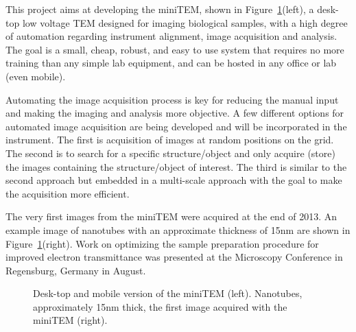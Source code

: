 \documentclass[10pt, a4paper]{article}
\begin{document}
\begin{enumerate}
{This project aims at developing the miniTEM, shown in Figure~\ref{fig:miniTEM}(left), a desk-top low voltage TEM designed for imaging biological samples, with a high degree of automation regarding instrument alignment, image acquisition and analysis. The goal is a small, cheap, robust, and easy to use system that requires no more training than any simple lab equipment, and can be hosted in any office or lab (even mobile).

Automating the image acquisition process is key for reducing the manual input and making the imaging and analysis more objective. A few different options for automated image acquisition are being developed and will be incorporated in the instrument. The first is acquisition of images at random positions on the grid. The second is to search for a specific structure/object and only acquire (store) the images containing the structure/object of interest. The third is similar to the second approach but embedded in a multi-scale approach with the goal to make the acquisition more efficient.

The very first images from the miniTEM were acquired at the end of 2013. An example image of nanotubes with an approximate thickness of 15nm are shown in Figure~\ref{fig:miniTEM}(right). Work on optimizing the sample preparation procedure for improved electron transmittance was presented at the Microscopy Conference in Regensburg, Germany in August.}

\begin{figure}[!h]
\centering
{}
\caption{Desk-top and mobile version of the miniTEM (left). Nanotubes, approximately 15nm thick, the first image acquired with the miniTEM (right).}
\label{fig:miniTEM}
\end{figure}


\end{enumerate}
\end{document}
